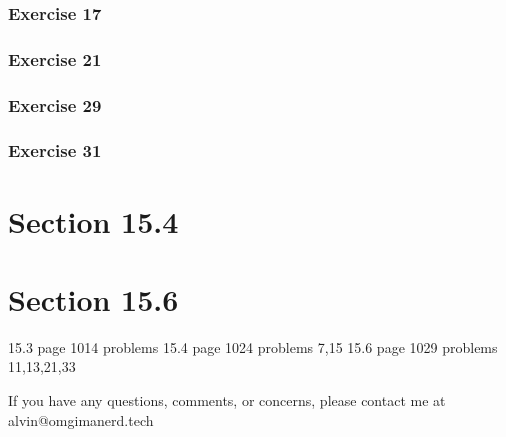 \documentclass{math}
\begin{document}
\subsubsection*{Exercise 17}
\subsubsection*{Exercise 21}
\subsubsection*{Exercise 29}
\subsubsection*{Exercise 31}

\section*{Section 15.4}

\section*{Section 15.6}


15.3     page 1014    problems
15.4     page 1024    problems   7,15
15.6     page 1029   problems   11,13,21,33​

\begin{center}
  If you have any questions, comments, or concerns, please contact me at
  alvin@omgimanerd.tech
\end{center}
\end{document}
